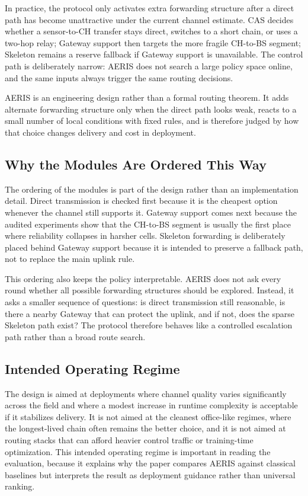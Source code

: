 \documentclass[letterpaper,conference]{IEEEtran}
\begin{document}
In practice, the protocol only activates extra forwarding structure after a direct path has become unattractive under the current channel estimate. CAS decides whether a sensor-to-CH transfer stays direct, switches to a short chain, or uses a two-hop relay; Gateway support then targets the more fragile CH-to-BS segment; Skeleton remains a reserve fallback if Gateway support is unavailable. The control path is deliberately narrow: AERIS does not search a large policy space online, and the same inputs always trigger the same routing decisions.

AERIS is an engineering design rather than a formal routing theorem. It adds alternate forwarding structure only when the direct path looks weak, reacts to a small number of local conditions with fixed rules, and is therefore judged by how that choice changes delivery and cost in deployment.

\subsection{Why the Modules Are Ordered This Way}
The ordering of the modules is part of the design rather than an implementation detail. Direct transmission is checked first because it is the cheapest option whenever the channel still supports it. Gateway support comes next because the audited experiments show that the CH-to-BS segment is usually the first place where reliability collapses in harsher cells. Skeleton forwarding is deliberately placed behind Gateway support because it is intended to preserve a fallback path, not to replace the main uplink rule.

This ordering also keeps the policy interpretable. AERIS does not ask every round whether all possible forwarding structures should be explored. Instead, it asks a smaller sequence of questions: is direct transmission still reasonable, is there a nearby Gateway that can protect the uplink, and if not, does the sparse Skeleton path exist? The protocol therefore behaves like a controlled escalation path rather than a broad route search.

\subsection{Intended Operating Regime}
The design is aimed at deployments where channel quality varies significantly across the field and where a modest increase in runtime complexity is acceptable if it stabilizes delivery. It is not aimed at the cleanest office-like regimes, where the longest-lived chain often remains the better choice, and it is not aimed at routing stacks that can afford heavier control traffic or training-time optimization. This intended operating regime is important in reading the evaluation, because it explains why the paper compares AERIS against classical baselines but interprets the result as deployment guidance rather than universal ranking.
\end{document}
